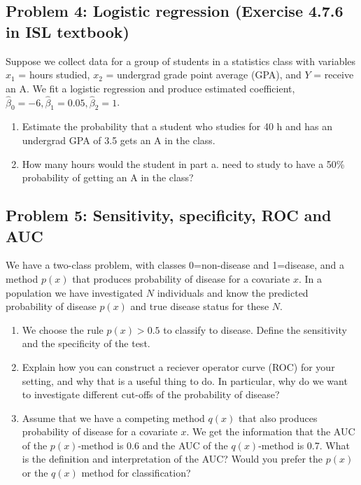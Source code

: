 \documentclass[]{article}
\providecommand{\tightlist}{%
  \setlength{\itemsep}{0pt}\setlength{\parskip}{0pt}}
\begin{document}
\subsection{Problem 4: Logistic regression (Exercise 4.7.6 in ISL
textbook)}\label{problem-4-logistic-regression-exercise-4.7.6-in-isl-textbook}

Suppose we collect data for a group of students in a statistics class
with variables \(x_1\) = hours studied, \(x_2\) = undergrad grade point
average (GPA), and \(Y\) = receive an A. We fit a logistic regression
and produce estimated coefficient,
\(\hat{\beta}_0 = -6, \hat{\beta}_1 = 0.05, \hat{\beta}_2 = 1\).

\begin{enumerate}
\def\labelenumi{\alph{enumi}.}
\tightlist
\item
  Estimate the probability that a student who studies for 40 h and has
  an undergrad GPA of 3.5 gets an A in the class.\\
\item
  How many hours would the student in part a. need to study to have a
  50\% probability of getting an A in the class?
\end{enumerate}

\subsection{Problem 5: Sensitivity, specificity, ROC and
AUC}\label{problem-5-sensitivity-specificity-roc-and-auc}

We have a two-class problem, with classes 0=non-disease and 1=disease,
and a method \(p(x)\) that produces probability of disease for a
covariate \(x\). In a population we have investigated \(N\) individuals
and know the predicted probability of disease \(p(x)\) and true disease
status for these \(N\).

\begin{enumerate}
\def\labelenumi{\alph{enumi}.}
\tightlist
\item
  We choose the rule \(p(x)>0.5\) to classify to disease. Define the
  sensitivity and the specificity of the test.
\item
  Explain how you can construct a reciever operator curve (ROC) for your
  setting, and why that is a useful thing to do. In particular, why do
  we want to investigate different cut-offs of the probability of
  disease?
\item
  Assume that we have a competing method \(q(x)\) that also produces
  probability of disease for a covariate \(x\). We get the information
  that the AUC of the \(p(x)\)-method is 0.6 and the AUC of the
  \(q(x)\)-method is 0.7. What is the definition and interpretation of
  the AUC? Would you prefer the \(p(x)\) or the \(q(x)\) method for
  classification?
\end{enumerate}
\end{document}
